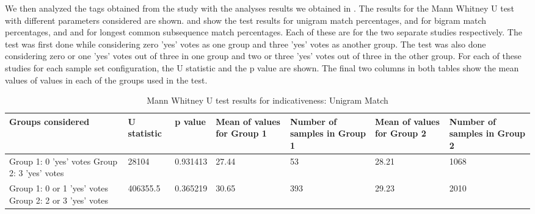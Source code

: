 We then analyzed the tags obtained from the study with the analyses results we obtained in . The results for the Mann Whitney U test \citep{mann1947test,wilcoxon1947probability} with different parameters considered are shown.  and  show the test results for unigram match percentages,  and  for bigram match percentages, and  and  for longest common subsequence match percentages. Each of these are for the two separate studies respectively.  The test was first done while considering zero 'yes' votes as one group and three 'yes' votes as another group. The test was also done considering zero or  one 'yes' votes out of three in one group and two or three 'yes' votes out of three in the other group. For each of these studies for each sample set configuration, the U statistic and the p value are shown. The final two columns in both tables show the mean values of values in each of the groups used in the test. 

\begin{table}[!htbp]
\caption{Mann Whitney U test results for indicativeness: Unigram Match}
\centering
\label{tab:unicorr1}
\begin{tabular}{|p{}|p{}|p{}|p{}|p{}|p{}|p{}|}
\hline
Groups considered    & U statistic & p value & Mean of values for Group 1 & Number of samples in Group 1 & Mean of values for Group 2 & Number of samples in Group 2\\ \hline
Group 1: 0 'yes' votes \newline Group 2: 3 'yes' votes &  28104  &  0.931413  &  27.44  & 53 & 28.21 &   1068  \\ \hline
Group 1: 0 or 1 'yes' votes \newline Group 2: 2 or 3 'yes' votes &   406355.5  & 0.365219 & 30.65  & 393 & 29.23 & 2010 \\ \hline
\end{tabular}
\end{table}


